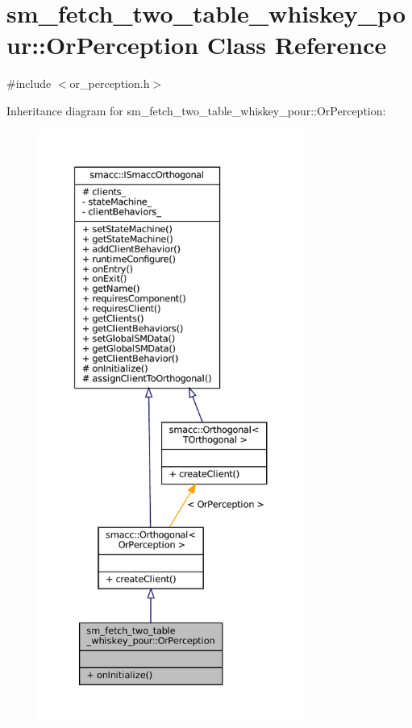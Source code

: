 \hypertarget{classsm__fetch__two__table__whiskey__pour_1_1OrPerception}{}\section{sm\+\_\+fetch\+\_\+two\+\_\+table\+\_\+whiskey\+\_\+pour\+:\+:Or\+Perception Class Reference}
\label{classsm__fetch__two__table__whiskey__pour_1_1OrPerception}


{\ttfamily \#include $<$or\+\_\+perception.\+h$>$}



Inheritance diagram for sm\+\_\+fetch\+\_\+two\+\_\+table\+\_\+whiskey\+\_\+pour\+:\+:Or\+Perception\+:
\nopagebreak
\begin{figure}[H]
\begin{center}
\leavevmode
\includegraphics[height=550pt]{classsm__fetch__two__table__whiskey__pour_1_1OrPerception__inherit__graph}
\end{center}
\end{figure}


